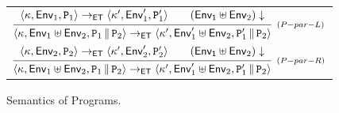 \begin{figure}
\begin{tabular}{|@{}c@{}|}
$
\infer[{\scriptstyle (P-par-L)}]
{\langle \hh, \mathsf{Env}_1 \uplus \mathsf{Env}_2, \prog_1 \Par \prog_2 \rangle 
\rightarrow_{\ET} \langle \hh', \mathsf{Env}_1' \uplus \mathsf{Env}_2, 
\prog_1' \Par \prog_2 \rangle }
{ \begin{array}{c}
\langle \hh, \mathsf{Env}_1, \prog_1 \rangle \rightarrow_{\ET} \langle \hh', \mathsf{Env}_1', \prog_1' \rangle
\qquad (\mathsf{Env_1} \uplus \mathsf{Env}_2)\downarrow
\end{array}
}
$
\\[8pt]
$
\infer[{\scriptstyle (P-par-R)}]
{\langle \hh, \mathsf{Env}_1 \uplus \mathsf{Env}_2, \prog_1 \Par \prog_2 \rangle 
\rightarrow_{\ET} \langle \hh', \mathsf{Env}_1' \uplus \mathsf{Env}_2, 
\prog_1' \Par \prog_2 \rangle }
{ \begin{array}{c}
\langle \hh, \mathsf{Env}_2, \prog_2 \rangle \rightarrow_{\ET} \langle \hh', \mathsf{Env}_2', \prog_2' \rangle
\qquad (\mathsf{Env_1} \uplus \mathsf{Env}_2)\downarrow
\end{array}
}
$\\[8pt]
\hline
\end{tabular}
\caption{Semantics of Programs.}
\label{fig:semantics.prog}
\end{figure}

